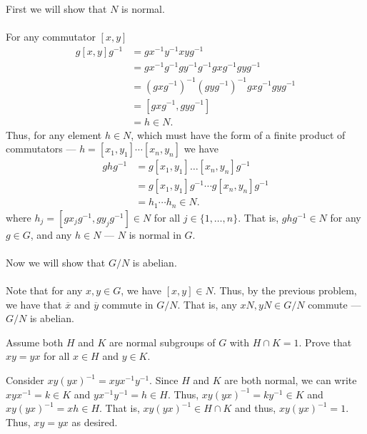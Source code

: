\documentclass[12 pt, letterpaper]{hmcpset}
\begin{document}
\begin{solution}
	First we will show that $N$ is normal. \\\\
	For any commutator $[x, y]$
	\[
		\begin{split}
			g [x, y] g^{-1} & = g x^{-1} y^{-1} x y g^{-1} \\
					& = g x^{-1} g^{-1} g y^{-1} g^{-1} g x g^{-1} g y g^{-1} \\
					& = (g x g^{-1})^{-1} (g y g^{-1})^{-1} g x g^{-1} g y g^{-1} \\
					& = [g x g^{-1}, g y g^{-1}] \\
					& = h \in N.
		\end{split}
	\]
	Thus, for any element $h \in N$, which must have the form of a finite product of commutators --- $h = [x_{1}, y_{1}] \cdots [x_{n}, y_{n}]$ we have \[
		\begin{split}
			ghg^{-1} & = g [x_{1}, y_{1}] \dots [x_{n}, y_{n}] g^{-1} \\
				 & = g [x_{1}, y_{1}] g^{-1} \cdots g [x_{n}, y_{n}] g^{-1} \\
				 & = h_{1} \cdots h_{n} \in N.
		\end{split}
	\]
	where $h_{j} = [g x_{j} g^{-1}, g y_{j} g^{-1}] \in N$ for all $j \in \{ 1, \dots, n \}$. That is, $ghg^{-1} \in N$ for any $g \in G$, and any $h \in N$ --- $N$ is normal in $G$. \\\\
	Now we will show that $G/N$ is abelian. \\\\
	Note that for any $x, y \in G$, we have $[x, y] \in N$. Thus, by the previous problem, we have that $\overline{x}$ and $\overline{y}$ commute in $G/N$. That is, any $xN, yN \in G/N$ commute --- $G/N$ is abelian.
\end{solution}

\pagebreak

\begin{problem}
	Assume both $H$ and $K$ are normal subgroups of $G$ with $H \cap K = 1$. Prove that $xy = yx$ for all $x \in H$ and $y \in K$.
\end{problem}

\begin{solution}
	Consider $xy(yx)^{-1} = xy x^{-1} y^{-1}$. Since $H$ and $K$ are both normal, we can write $x y x^{-1} = k \in K$ and $y x^{-1} y^{-1} = h \in H$. Thus, $xy(yx)^{-1} = k y^{-1} \in K$ and $xy(yx)^{-1} = x h \in H$. That is, $xy(yx)^{-1} \in H \cap K$ and thus, $xy(yx)^{-1} = 1$. Thus, $xy = yx$ as desired.
\end{solution}
\end{document}
